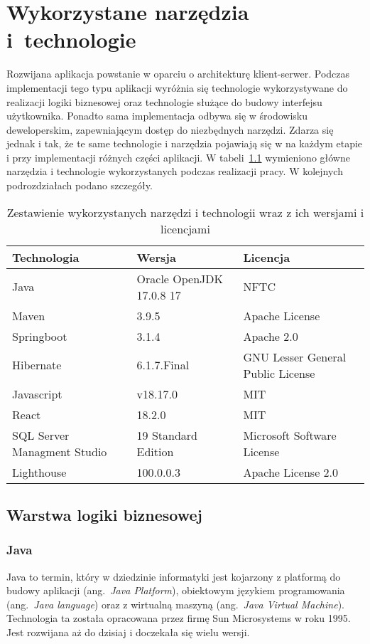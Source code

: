 \chapter{Wykorzystane narzędzia i~technologie}
Rozwijana aplikacja powstanie w oparciu o architekturę klient-serwer. Podczas implementacji tego typu aplikacji wyróżnia się technologie wykorzystywane do realizacji logiki biznesowej oraz technologie służące do budowy interfejsu użytkownika. Ponadto sama implementacja odbywa się w środowisku deweloperskim, zapewniającym dostęp do niezbędnych narzędzi. Zdarza się jednak i tak, że te same technologie i narzędzia pojawiają się w na każdym etapie i przy implementacji różnych części aplikacji.
W tabeli~\ref{tab:zestawienie_narzędzi} wymieniono główne narzędzia i technologie wykorzystanych podczas realizacji pracy.
W kolejnych podrozdziałach podano szczegóły.


\begin{table}[htb] \small
	\centering
\caption{Zestawienie wykorzystanych narzędzi i technologii wraz z ich wersjami i licencjami}
\label{tab:zestawienie_narzędzi}
\begin{tabularx}{\linewidth}{|l|l|X|}
    \hline
    Technologia & Wersja & Licencja \\
    \hline \hline
    Java & Oracle OpenJDK 17.0.8 17 &  NFTC\\
    \hline
    Maven & 3.9.5 & Apache License\\
    \hline
    Springboot & 3.1.4 & Apache 2.0\\
    \hline
    Hibernate & 6.1.7.Final & GNU Lesser General Public License \\
    \hline
		Javascript & v18.17.0 & MIT \\
    \hline
		React & 18.2.0 & MIT \\
    \hline
		SQL Server Managment Studio & 19 Standard Edition & Microsoft Software License\\
		 \hline
		Lighthouse & 100.0.0.3 & Apache License 2.0\\

    \hline
\end{tabularx}
\end{table}

\section{Warstwa logiki biznesowej}
\subsection{Java}
Java to termin, który w dziedzinie informatyki jest kojarzony z platformą do budowy aplikacji (ang.~\emph{Java Platform}), obiektowym językiem programowania (ang.~\emph{Java language}) oraz z wirtualną maszyną (ang.~\emph{Java Virtual Machine}). Technologia ta została opracowana przez firmę Sun Microsystems w roku 1995. Jest rozwijana aż do dzisiaj i doczekała się wielu wersji. 

